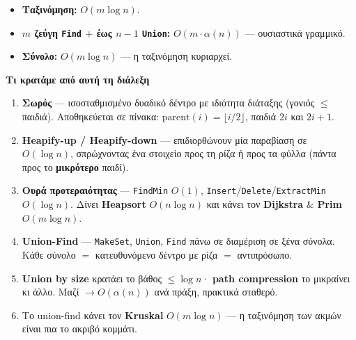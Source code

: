 \documentclass[11pt,a4paper]{article}
\begin{document}
\begin{itemize}
  \item \textbf{Ταξινόμηση:} $O(m \log n)$.
  \item \textbf{$m$ ζεύγη \texttt{Find} $+$ έως $n-1$ \texttt{Union}:}
  $O(m \cdot \alpha(n))$ --- ουσιαστικά γραμμικό.
  \item \textbf{Σύνολο:} $O(m \log n)$ --- η ταξινόμηση κυριαρχεί.
\end{itemize}

\begin{recapbox}
\textbf{Τι κρατάμε από αυτή τη διάλεξη}
\begin{enumerate}
  \item \textbf{Σωρός} --- ισοσταθμισμένο δυαδικό δέντρο με ιδιότητα διάταξης
  (γονιός $\le$ παιδιά). Αποθηκεύεται σε πίνακα:
  $\text{parent}(i) = \lfloor i/2 \rfloor$, παιδιά $2i$ και $2i+1$.
  \item \textbf{Heapify-up / Heapify-down} --- επιδιορθώνουν μία παραβίαση σε
  $O(\log n)$, σπρώχνοντας ένα στοιχείο προς τη ρίζα ή προς τα φύλλα (πάντα προς
  το \textbf{μικρότερο} παιδί).
  \item \textbf{Ουρά προτεραιότητας} --- \texttt{FindMin} $O(1)$,
  \texttt{Insert}/\texttt{Delete}/\texttt{ExtractMin} $O(\log n)$. Δίνει
  \textbf{Heapsort} $O(n \log n)$ και κάνει τον \textbf{Dijkstra} \& \textbf{Prim}
  $O(m \log n)$.
  \item \textbf{Union-Find} --- \texttt{MakeSet}, \texttt{Union}, \texttt{Find}
  πάνω σε διαμέριση σε ξένα σύνολα. Κάθε σύνολο $=$ κατευθυνόμενο δέντρο με ρίζα
  $=$ αντιπρόσωπο.
  \item \textbf{Union by size} κρατάει το βάθος $\le \log n$· \textbf{path
  compression} το μικραίνει κι άλλο. Μαζί $\to O(\alpha(n))$ ανά πράξη, πρακτικά
  σταθερό.
  \item Το union-find κάνει τον \textbf{Kruskal} $O(m \log n)$ --- η ταξινόμηση
  των ακμών είναι πια το ακριβό κομμάτι.
\end{enumerate}
\end{recapbox}

\lecturefooter
\end{document}
